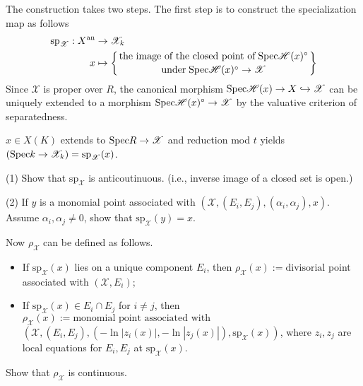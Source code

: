 The construction takes two steps. The first step is to construct the specialization map as follows
\begin{align*}
\mathrm{sp}_{\mathscr{X}}:X^{\mathrm{an}}&\rightarrow \mathscr{X}_{k} \\
x&\mapsto
\left\{
\text{the image of the closed point of} \; \mathrm{Spec}\mathscr{H}(x)^{\circ} \scriptstyle \atop
\text{under} \; \mathrm{Spec}\mathscr{H}(x)^{\circ}\rightarrow\mathscr{X}
\right\}
\end{align*}
Since $\mathscr{X}$ is proper over $R$, the canonical morphism $\mathrm{Spec}\mathscr{H}(x)\rightarrow X\hookrightarrow
\mathscr{X}$ can be uniquely extended to a morphism $\mathrm{Spec}\mathscr{H}(x)^{\circ}\rightarrow\mathscr{X}$ by the
valuative criterion of separatedness.

\begin{example}
$x\in X(K)$ extends to $\mathrm{Spec} R\rightarrow \mathscr{X}$ and reduction mod $t$ yields
$(\mathrm{Spec} k\rightarrow\mathscr{X}_{k})=\mathrm{sp}_{\mathscr{X}}(x)$.
\end{example}

\begin{exercise}
(1) Show that $\mathrm{sp}_{\mathscr{X}}$ is anticoutinuous. (i.e., inverse image of a closed set is open.)

(2) If $y$ is a monomial point associated with $(\mathscr{X},(E_{i},E_{j}),(\alpha_{i},\alpha_{j}),x)$.
Assume $\alpha_{i},\alpha_{j}\neq 0$, show that $\mathrm{sp}_{\mathscr{X}}(y)=x$.
\end{exercise}

Now $\rho_{\mathscr{X}}$ can be defined as follows.
\begin{itemize}
  \item If $\mathrm{sp}_{\mathscr{X}}(x)$ lies on a unique component $E_{i}$, then
        $\rho_{\mathscr{X}}(x):=\text{divisorial}$ point associated with $(\mathscr{X},E_{i})$;
  \item If $\mathrm{sp}_{\mathscr{X}}(x)\in E_{i}\cap E_{j}$ for $i\neq j$, then
        $\rho_{\mathscr{X}}(x):=\text{monomial point associated with}$
        $(\mathscr{X},(E_{i},E_{j}),(-\ln|z_{i}(x)|,-\ln|z_{j}(x)|),\mathrm{sp}_{\mathscr{X}}(x))$, where
        $z_{i},z_{j}$ are local equations for $E_{i},E_{j}$ at $\mathrm{sp}_{\mathscr{X}}(x)$.
\end{itemize}

\begin{exercise}
Show that $\rho_{\mathscr{X}}$ is continuous.
\end{exercise}
